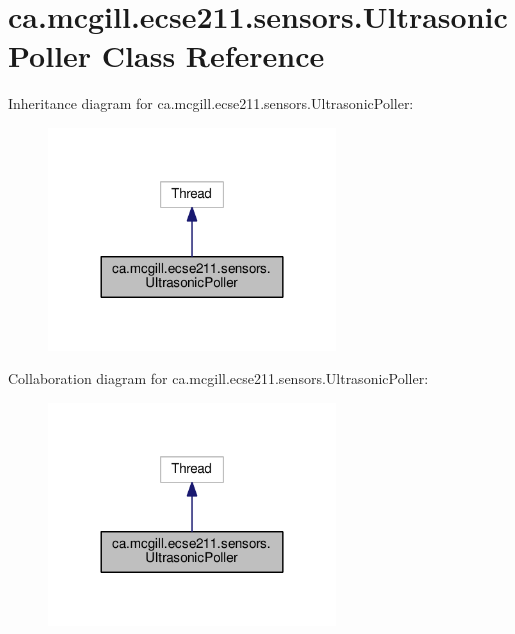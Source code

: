 \hypertarget{classca_1_1mcgill_1_1ecse211_1_1sensors_1_1_ultrasonic_poller}{}\section{ca.\+mcgill.\+ecse211.\+sensors.\+Ultrasonic\+Poller Class Reference}
\label{classca_1_1mcgill_1_1ecse211_1_1sensors_1_1_ultrasonic_poller}


Inheritance diagram for ca.\+mcgill.\+ecse211.\+sensors.\+Ultrasonic\+Poller\+:
\nopagebreak
\begin{figure}[H]
\begin{center}
\leavevmode
\includegraphics[width=216pt]{classca_1_1mcgill_1_1ecse211_1_1sensors_1_1_ultrasonic_poller__inherit__graph}
\end{center}
\end{figure}


Collaboration diagram for ca.\+mcgill.\+ecse211.\+sensors.\+Ultrasonic\+Poller\+:
\nopagebreak
\begin{figure}[H]
\begin{center}
\leavevmode
\includegraphics[width=216pt]{classca_1_1mcgill_1_1ecse211_1_1sensors_1_1_ultrasonic_poller__coll__graph}
\end{center}
\end{figure}
